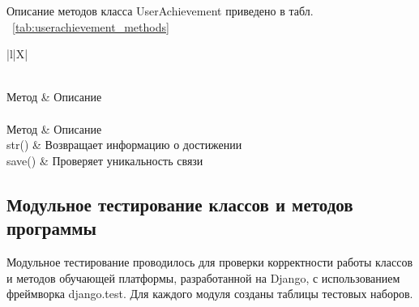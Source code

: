 Описание методов класса UserAchievement приведено в табл. ~\ref {tab:userachievement_methods}

\begin{xltabular}{\textwidth}{|l|X|}
	\caption{Методы класса UserAchievement\label{tab:userachievement_methods}}\\
	\hline
	Метод & Описание \\ \hline
	\endfirsthead
	\\
	\hline
	Метод & Описание \\ \hline
	\endhead
	str() & Возвращает информацию о достижении \\ \hline
	save() & Проверяет уникальность связи \\ \hline
\end{xltabular}

\subsection{Модульное тестирование классов и методов программы}

Модульное тестирование проводилось для проверки корректности работы классов и методов обучающей платформы, разработанной на Django, с использованием фреймворка django.test. Для каждого модуля созданы таблицы тестовых наборов.

